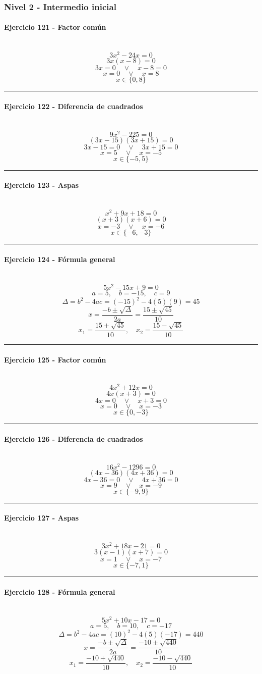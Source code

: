 \documentclass[10pt,a4paper]{article}
\newcommand{\res}[1]{\paragraph{#1}\mbox{}\\[-1.2em]}
\begin{document}
\subsubsection*{Nivel 2 - Intermedio inicial}
\res{Ejercicio 121 - Factor común}
\[ 3 x^{2} - 24 x=0 \]
\[ 3x(x-8)=0 \]
\[ 3x=0 \quad \vee \quad x-8=0 \]
\[ x=0 \quad \vee \quad x=8 \]
\[ \boxed{x\in\{0,8\}} \]
\vspace{1mm}\hrule\vspace{2mm}
\res{Ejercicio 122 - Diferencia de cuadrados}
\[ 9 x^{2} - 225=0 \]
\[ (3x-15)(3x+15)=0 \]
\[ 3x-15=0 \quad \vee \quad 3x+15=0 \]
\[ x=5 \quad \vee \quad x=-5 \]
\[ \boxed{x\in\{-5,5\}} \]
\vspace{1mm}\hrule\vspace{2mm}
\res{Ejercicio 123 - Aspas}
\[ x^{2} + 9 x + 18=0 \]
\[ (x+3)(x+6)=0 \]
\[ x=-3 \quad \vee \quad x=-6 \]
\[ \boxed{x\in\{-6,-3\}} \]
\vspace{1mm}\hrule\vspace{2mm}
\res{Ejercicio 124 - Fórmula general}
\[ 5 x^{2} - 15 x + 9=0 \]
\[ a=5,\quad b=-15,\quad c=9 \]
\[ \Delta=b^2-4ac=(-15)^2-4(5)(9)=45 \]
\[ x=\frac{-b\pm\sqrt{\Delta}}{2a}=\frac{15\pm\sqrt{45}}{10} \]
\[ \boxed{x_1=\frac{15+\sqrt{45}}{10},\quad x_2=\frac{15-\sqrt{45}}{10}} \]
\vspace{1mm}\hrule\vspace{2mm}
\res{Ejercicio 125 - Factor común}
\[ 4 x^{2} + 12 x=0 \]
\[ 4x(x+3)=0 \]
\[ 4x=0 \quad \vee \quad x+3=0 \]
\[ x=0 \quad \vee \quad x=-3 \]
\[ \boxed{x\in\{0,-3\}} \]
\vspace{1mm}\hrule\vspace{2mm}
\res{Ejercicio 126 - Diferencia de cuadrados}
\[ 16 x^{2} - 1296=0 \]
\[ (4x-36)(4x+36)=0 \]
\[ 4x-36=0 \quad \vee \quad 4x+36=0 \]
\[ x=9 \quad \vee \quad x=-9 \]
\[ \boxed{x\in\{-9,9\}} \]
\vspace{1mm}\hrule\vspace{2mm}
\res{Ejercicio 127 - Aspas}
\[ 3 x^{2} + 18 x - 21=0 \]
\[ 3(x-1)(x+7)=0 \]
\[ x=1 \quad \vee \quad x=-7 \]
\[ \boxed{x\in\{-7,1\}} \]
\vspace{1mm}\hrule\vspace{2mm}
\res{Ejercicio 128 - Fórmula general}
\[ 5 x^{2} + 10 x - 17=0 \]
\[ a=5,\quad b=10,\quad c=-17 \]
\[ \Delta=b^2-4ac=(10)^2-4(5)(-17)=440 \]
\[ x=\frac{-b\pm\sqrt{\Delta}}{2a}=\frac{-10\pm\sqrt{440}}{10} \]
\[ \boxed{x_1=\frac{-10+\sqrt{440}}{10},\quad x_2=\frac{-10-\sqrt{440}}{10}} \]
\end{document}
